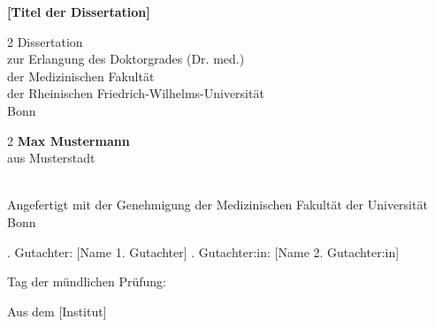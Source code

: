 \begin{titlepage}
\doublespacing
\begin{center}

{\customeighteenpt \textbf{[Titel der Dissertation]}}\\
\vspace{6cm}
\begin{spacing}{2}
{\customfourteenpt Dissertation}\\ 
{\customfourteenpt zur Erlangung des Doktorgrades (Dr. med.)}\\
{\customfourteenpt der Medizinischen Fakultät}\\
{\customfourteenpt der Rheinischen Friedrich-Wilhelms-Universität}\\
{\customfourteenpt Bonn}\\
\end{spacing}
   
\vspace{5cm}
\begin{spacing}{2}
{\customeighteenpt \textbf{Max Mustermann}}\\
{\customfourteenpt aus Musterstadt}\\
{\customfourteenpt [Jahr]}\\
\end{spacing}
\end{center}

\newpage
\thispagestyle{empty}
\noindent Angefertigt mit der Genehmigung  \newline
der Medizinischen Fakultät der Universität Bonn

\vspace{55mm}

. Gutachter: [Name 1. Gutachter] . Gutachter:in: [Name 2. Gutachter:in]

\vspace{55mm}

\noindent Tag der mündlichen Prüfung:

\vspace{55mm}
\noindent Aus dem [Institut]
\end{titlepage}
